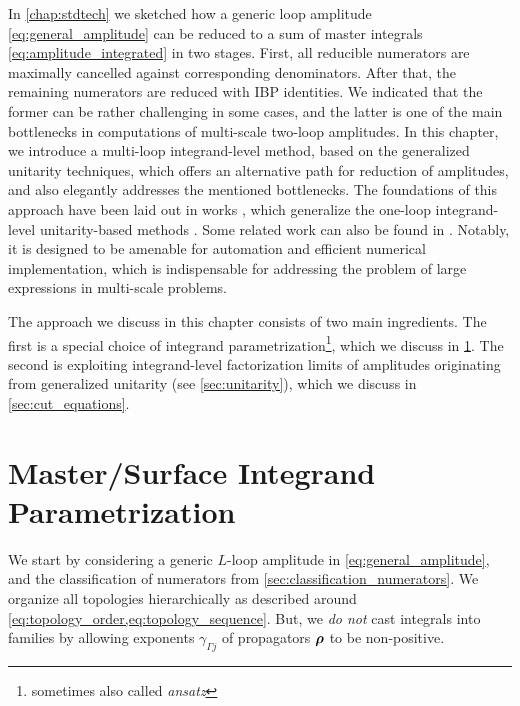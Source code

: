 In \cref{chap:stdtech} we sketched how a generic loop amplitude \eqref{eq:general_amplitude} can be reduced
to a sum of master integrals \eqref{eq:amplitude_integrated} in two stages.
First, all reducible numerators are maximally cancelled against corresponding denominators.
After that, the remaining numerators are reduced with IBP identities.
We indicated that the former can be rather challenging in some cases,
and the latter is one of the main bottlenecks in computations of multi-scale two-loop amplitudes.
In this chapter, we introduce a multi-loop integrand-level method, based on the generalized unitarity techniques,
which offers an alternative path for reduction of amplitudes, and also elegantly addresses the mentioned bottlenecks.
The foundations of this approach have been laid out in works \cite{Ita:2015tya,Abreu:2017xsl,Abreu:2017hqn,Abreu:2017idw},
which generalize the one-loop integrand-level unitarity-based methods \cite{Ossola:2006us,Giele:2008ve,Ellis:2008ir}.
Some related work can also be found in 
\cite{Mastrolia:2011pr,Badger:2012dp,Badger:2013gxa,Zhang:2012ce,Mastrolia:2013kca,Mastrolia:2016dhn,Mastrolia:2012an,Kleiss:2012yv,Feng:2012bm,Kosower:2011ty}.
Notably, it is designed to be amenable for automation and efficient numerical implementation, which is indispensable
for addressing the problem of large expressions in multi-scale problems.

The approach we discuss in this chapter consists of two main ingredients.
The first is a special choice of integrand parametrization\footnote{sometimes also called \emph{ansatz}},
which we discuss in \cref{sec:ansatz_integrand}.
The second is exploiting integrand-level factorization limits of amplitudes originating from generalized unitarity (see \cref{sec:unitarity}),
which we discuss in \cref{sec:cut_equations}.




\section{Master/Surface Integrand Parametrization}
\label{sec:ansatz_integrand}

We start by considering a generic $L$-loop amplitude in \cref{eq:general_amplitude},
and  the classification of numerators from \cref{sec:classification_numerators}.
We organize all topologies hierarchically as described around \cref{eq:topology_order,eq:topology_sequence}.
But, we \emph{do not} cast integrals into families by allowing exponents $\gamma_{\Gamma j}$ of propagators $\vb*{\rho}$ to be non-positive.

